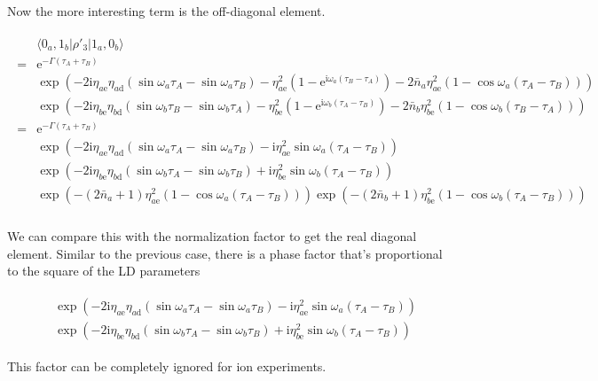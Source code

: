 \documentclass[10pt,fleqn]{article}
\newcommand{\ue}{\mathrm{e}}
\newcommand{\ui}{\mathrm{i}}
\newcommand{\eqar}[1]
{
  \begin{align}
    #1
  \end{align}
}
\newcommand{\paren}[1]{{\left({#1}\right)}}
\begin{document}
Now the more interesting term is the off-diagonal element.
\eqar{
  \begin{split}
    &\langle0_a,1_b|\rho'_3|1_a,0_b\rangle\\
    =&\ue^{-\Gamma\paren{\tau_A+\tau_B}}\\
    &\exp\paren{
      -2\ui\eta_{a\mathrm{e}}
      \eta_{a\mathrm{d}}\paren{\sin\omega_a\tau_{A}-\sin\omega_a\tau_{B}}
      -\eta_{a\mathrm{e}}^2\paren{1-\ue^{\ui\omega_a\paren{\tau_{B}-\tau_{A}}}}
      -2{\bar n_a}\eta_{a\mathrm{e}}^2\paren{1-\cos\omega_a\paren{\tau_{A}-\tau_{B}}}
      }\\
    &\exp\paren{
      -2\ui\eta_{b\mathrm{e}}
      \eta_{b\mathrm{d}}\paren{\sin\omega_b\tau_{B}-\sin\omega_b\tau_{A}}
      -\eta_{b\mathrm{e}}^2\paren{1-\ue^{\ui\omega_b\paren{\tau_{A}-\tau_{B}}}}
      -2{\bar n_b}\eta_{b\mathrm{e}}^2\paren{1-\cos\omega_b\paren{\tau_{B}-\tau_{A}}}
      }\\
    =&\ue^{-\Gamma\paren{\tau_A+\tau_B}}\\
    &\exp\paren{
      -2\ui\eta_{a\mathrm{e}}\eta_{a\mathrm{d}}
      \paren{\sin\omega_a\tau_{A}-\sin\omega_a\tau_{B}}
      -\ui\eta_{a\mathrm{e}}^2\sin\omega_a\paren{\tau_{A}-\tau_{B}}
      }\\
    &\exp\paren{
      -2\ui\eta_{b\mathrm{e}}\eta_{b\mathrm{d}}
      \paren{\sin\omega_b\tau_{A}-\sin\omega_b\tau_{B}}
      +\ui\eta_{b\mathrm{e}}^2\sin\omega_b\paren{\tau_{A}-\tau_{B}}
      }\\
    &\exp\paren{
      -\paren{2{\bar n_a}+1}\eta_{a\mathrm{e}}^2\paren{1-\cos\omega_a\paren{\tau_{A}-\tau_{B}}}
      }
      \exp\paren{
      -\paren{2{\bar n_b}+1}\eta_{b\mathrm{e}}^2\paren{1-\cos\omega_b\paren{\tau_{A}-\tau_{B}}}
      }\\
  \end{split}
}
We can compare this with the normalization factor to get the real diagonal element.
Similar to the previous case, there is a phase factor that's proportional
to the square of the LD parameters
\eqar{
  \begin{split}
    &\exp\paren{
    -2\ui\eta_{a\mathrm{e}}\eta_{a\mathrm{d}}
    \paren{\sin\omega_a\tau_{A}-\sin\omega_a\tau_{B}}
    -\ui\eta_{a\mathrm{e}}^2\sin\omega_a\paren{\tau_{A}-\tau_{B}}
    }\\
    &\exp\paren{
    -2\ui\eta_{b\mathrm{e}}\eta_{b\mathrm{d}}
    \paren{\sin\omega_b\tau_{A}-\sin\omega_b\tau_{B}}
    +\ui\eta_{b\mathrm{e}}^2\sin\omega_b\paren{\tau_{A}-\tau_{B}}
    }
  \end{split}
}
This factor can be completely ignored for ion experiments.\\
\end{document}
